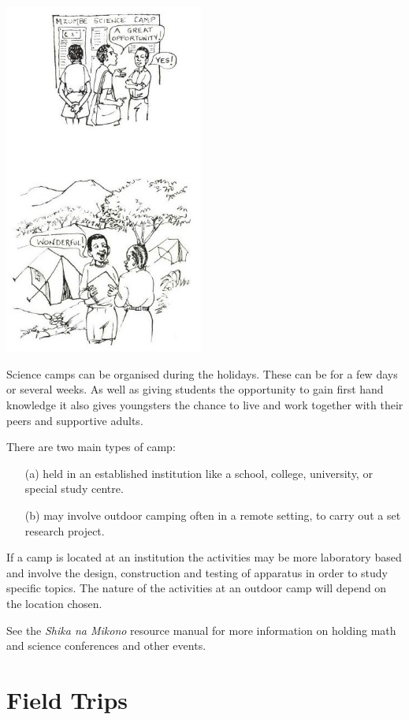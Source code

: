 \begin{multicols}{2}
\begin{center}
\includegraphics[width=0.49\textwidth]{./img/source/science-camps.jpg}
\end{center}

Science camps can be organised during the
holidays. These can be for a few days or several
weeks. As well as giving students the opportunity
to gain first hand knowledge it also gives
youngsters the chance to live and work together
with their peers and supportive adults.

There are two main types of camp:
\begin{enumerate}
\item[(a)] held in an
established institution like a school, college,
university, or special study centre.
\item[(b)] may
involve outdoor camping often in a remote
setting, to carry out a set research project.
\end{enumerate} 
If a camp is located at an institution the activities
may be more laboratory based and involve the
design, construction and testing of apparatus in
order to study specific topics. The nature of the
activities at an outdoor camp will depend on the
location chosen.

See the \emph{Shika na Mikono} resource manual for more information on holding math and science conferences and other events.


\section{Field Trips}  


\end{multicols}
